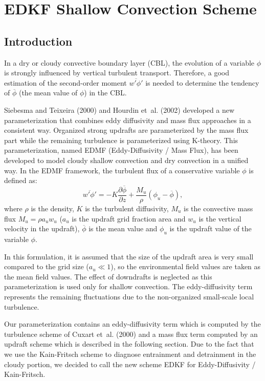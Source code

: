 \chapter{EDKF Shallow Convection Scheme}
\minitoc


\section{Introduction}

In a dry or cloudy convective boundary layer (CBL), the evolution of a variable $\phi$ is strongly influenced by vertical turbulent transport. Therefore, a good estimation of the second-order moment $\overline{w'\phi'}$ is needed to determine the tendency of $\overline\phi$ (the mean value of $\phi$) in the CBL.

Siebesma and Teixeira (2000) and Hourdin et~al. (2002) developed a new parameterization that combines eddy diffusivity and mass flux approaches in a consistent way. Organized strong updrafts are parameterized by the mass flux part while the remaining turbulence is parameterized using K-theory. This parameterization, named EDMF (Eddy-Diffusivity / Mass Flux), has been developed to model cloudy shallow convection and dry convection in a unified way. In the EDMF framework, the turbulent flux of a conservative variable $ \phi$ is defined as:
\begin{equation}
    \overline{w'\phi'}=-K\frac{\partial\overline{\phi}}{\partial{z}}+\frac{M_u}{\rho}(\phi_u-\overline{\phi}),
     \label{eq:EDMF}
\end{equation}
where $\rho$ is the density, $K$ is the turbulent diffusivity, $M_u$ is the convective mass flux $M_u=\rho a_u w_u$ ($a_u$ is the updraft grid fraction area and $w_u$ is the vertical velocity in the updraft), $\overline{\phi}$ is the mean value and $\phi_u$ is the updraft value of the variable $\phi$.

In this formulation, it is assumed that the size of the updraft area is very small compared to the grid size ($a_u \ll 1$), so the environmental field values are taken as the mean field values. The effect of downdrafts is neglected as this parameterization is used only for shallow convection. The eddy-diffusivity term represents the remaining fluctuations due to the non-organized small-scale local turbulence. 

Our parameterization contains an eddy-diffusivity term which is computed by the turbulence scheme of Cuxart et~al. (2000) and a mass flux term computed by an updraft scheme which is described in the following section. Due to the fact that we use the Kain-Fritsch scheme to diagnose entrainment and detrainment in the cloudy portion, we decided to call the new scheme EDKF for Eddy-Diffusivity / Kain-Fritsch.

